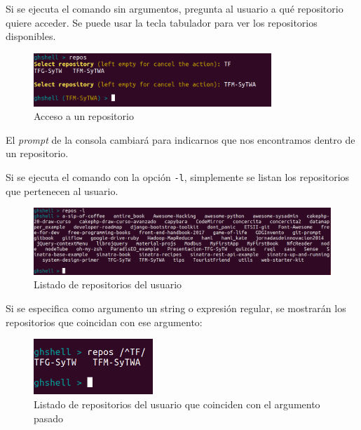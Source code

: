 \begin{itemize}
		Si se ejecuta el comando sin argumentos, pregunta al usuario a qué repositorio quiere acceder. Se puede usar la tecla tabulador para ver los repositorios disponibles.
		
		\begin{figure}[H]
		\begin{center}
		\includegraphics[width=0.8\textwidth]{images/repos1-1}
		\caption{Acceso a un repositorio}
		\label{fig:repos1-1}
		\end{center}
		\end{figure}
		
		
		El {\it prompt} de la consola cambiará para indicarnos que nos encontramos dentro de un repositorio.		
		\bigskip
		
		Si se ejecuta el comando con la opción \verb|-l|, simplemente se listan los repositorios que pertenecen al usuario.
		
		\begin{figure}[H]
		\begin{center}
		\includegraphics[width=1\textwidth]{images/repos1-2}
		\caption{Listado de repositorios del usuario}
		\label{fig:repos1-2}
		\end{center}
		\end{figure}

\newpage
	
		Si se especifica como argumento un string o expresión regular, se mostrarán los repositorios que coincidan con ese argumento:
		
		\begin{figure}[H]
		\begin{center}
		\includegraphics[width=0.4\textwidth]{images/repos1-3}
		\caption{Listado de repositorios del usuario que coinciden con el argumento pasado}
		\label{fig:repos1-3}
		\end{center}
		\end{figure}
		

\end{itemize}
